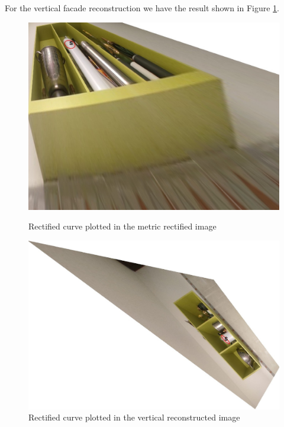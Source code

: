 \documentclass{Academic}
\begin{document}
For the vertical facade reconstruction we have the result shown in Figure \ref{fig:curve_vert}.
\begin{figure}[!htb]
    \centering
    \begin{minipage}{0.49\linewidth}
        \centering
        \includegraphics[width=\linewidth]{images/curve_ext.jpg}
        \caption{Rectified curve plotted in the metric rectified image}
        \label{fig:curve_ext}
    \end{minipage}
    \begin{minipage}{0.49\linewidth}
        \centering
        \includegraphics[width=\linewidth]{images/curve_vert.jpg}
        \caption{Rectified curve plotted in the vertical reconstructed image}
        \label{fig:curve_vert}
    \end{minipage}
\end{figure}
\end{document}
